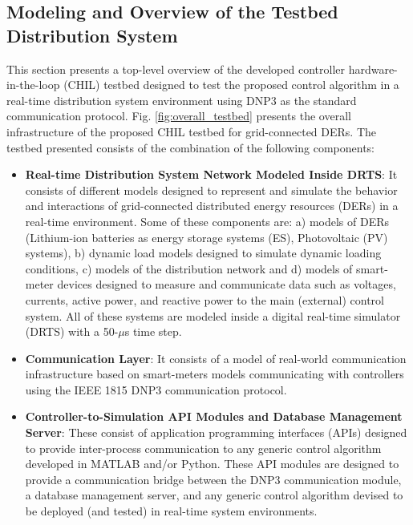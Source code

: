\subsection{Modeling and Overview of the Testbed Distribution System}
This section presents a top-level overview of the developed controller hardware-in-the-loop (CHIL) testbed designed to test the proposed control algorithm in a real-time distribution system environment using DNP3 as the standard communication protocol. Fig. \ref{fig:overall_testbed} presents the overall infrastructure of the proposed CHIL testbed for grid-connected DERs. The testbed presented consists of the combination of the following components:



\begin{itemize}
    \item \textbf{Real-time Distribution System Network Modeled Inside DRTS}: It consists of different models designed to represent and simulate the behavior and interactions of grid-connected distributed energy resources (DERs) in a real-time environment. Some of these components are: a) models of DERs (Lithium-ion batteries as energy storage systems (ES), Photovoltaic (PV) systems), b) dynamic load models designed to simulate dynamic loading conditions,  c) models of the distribution network and d) models of smart-meter devices designed to measure and communicate data such as voltages, currents, active power, and reactive power to the main (external) control system. All of these systems are modeled inside a digital real-time simulator (DRTS) with a 50-$\mu$s time step.
    
    
    \item \textbf{Communication Layer}: It consists of a model of real-world communication infrastructure based on smart-meters models communicating with controllers using the IEEE 1815 DNP3 communication protocol. 
    
    
    \item \textbf{Controller-to-Simulation API Modules and Database Management Server}: These consist of application programming interfaces (APIs) designed to provide inter-process communication to any generic control algorithm developed in MATLAB and/or Python. These API modules are designed to provide a communication bridge between the DNP3 communication module, a database management server, and any generic control algorithm devised to be deployed (and tested) in real-time system environments.
\end{itemize}


